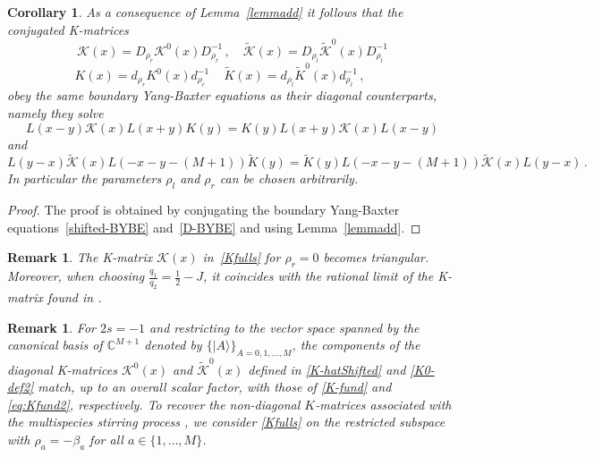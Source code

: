 \documentclass[11pt]{article}
\numberwithin{equation}{section}
\newtheorem{remark}[theorem]{Remark}
\newtheorem{corollary}[theorem]{Corollary}
\newcommand{\M}{M}
\newcommand{\Khat}{\mathcal{K}^{0}}
\newcommand{\K}{\widetilde{\mathcal{K}}^{0}}
\newcommand{\KhatFull}{\mathcal{K}}
\newcommand{\Kfull}{\widetilde{\mathcal{K}}}
\newcommand{\Khatfund}{K^{0}}
\newcommand{\Kfund}{\widetilde{K}^{0}}
\newcommand{\KhatFundFull}{K}
\newcommand{\KFundFull}{\widetilde{K}}
\begin{document}
\begin{corollary}\label{corollary-Full-K}
As a consequence of Lemma~\ref{lemmadd} it follows that the conjugated K-matrices
\begin{equation}\label{Kfulls}
   \KhatFull(x)=D_{\rho_{r}}\Khat(x)D_{\rho_{r}}^{-1}\,,\quad \Kfull(x)=D_{\rho_{l}}\K(x)D_{\rho_{l}}^{-1}
\end{equation}
\begin{equation}\label{Kfull-Fund}
  \KhatFundFull(x)=d_{\rho_{r}}\Khatfund(x)d_{\rho_{r}}^{-1}\,\quad \KFundFull(x)=d_{\rho_{l}} \Kfund(x)d_{\rho_{l}}^{-1}\,,\qquad 
\end{equation}
obey the same boundary Yang-Baxter equations as their diagonal counterparts, namely they solve
\begin{equation}
    L(x-y)\KhatFull(x){L}(x+y)\KhatFundFull(y)=\KhatFundFull(y)L(x+y)\KhatFull(x){L}(x-y)
\end{equation}
and 
\begin{equation}
    L(y-x)\Kfull(x)L(-x-y-(\M+1))\KFundFull(y)= \KFundFull(y)L(-x-y-(\M+1))\Kfull(x)L(y-x)\,.
\end{equation}
In particular the parameters $\rho_l$ and $\rho_{r}$ can be chosen arbitrarily.
\end{corollary}
\begin{proof}
 The proof is obtained by conjugating the boundary Yang-Baxter equations~\eqref{shifted-BYBE} and~\eqref{D-BYBE} and using Lemma~\ref{lemmadd}.
\end{proof}
\begin{remark}
 The K-matrix $\KhatFull(x)$ in~\eqref{Kfulls} for $\rho_r=0$ becomes triangular. Moreover, when choosing $\frac{q_{1}}{q_{2}}=\frac{1}{2}-J$, it coincides with the rational limit of the K-matrix found in \cite[(5.7)]{2024JPhA...57x5201K}.
\end{remark}
\begin{remark}
For $2s=-1$ and restricting to the vector space spanned by the canonical basis of $\mathbb{C}^{\M+1}$ denoted by $\{|A\rangle\}_{A=0,1,\ldots,\M}$, the components of the diagonal K-matrices $\Khat(x)$ and $\K(x)$ defined in \eqref{K-hatShifted} and \eqref{K0-def2} match, up to an overall scalar factor, with those of \eqref{K-fund} and \eqref{eq:Kfund2}, respectively. 
{ 
To recover the non-diagonal $K$-matrices associated with the multispecies stirring process \cite{vanicat2017exact,casini2024duality}, we consider \eqref{Kfulls} on the restricted subspace with  $\rho_{a}=-\beta_{a}$ for all $a\in \{1,\ldots, \M\}$.
} 
\end{remark}
\end{document}
